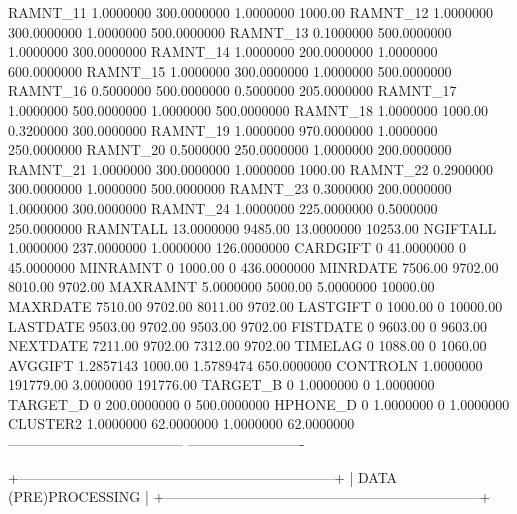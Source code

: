 \documentclass[
  11pt,
  a4paper,
  DIV=12,captions=tableheading,oneside,titlepage]{scrbook}
\let\oldverbatim\verbatim
\let\endoldverbatim\endverbatim
\renewenvironment{verbatim}{\footnotesize\oldverbatim}{\endoldverbatim}
\begin{document}
\begin{verbatim}
  RAMNT_11       1.0000000   300.0000000     1.0000000       1000.00 
  RAMNT_12       1.0000000   300.0000000     1.0000000   500.0000000 
  RAMNT_13       0.1000000   500.0000000     1.0000000   300.0000000 
  RAMNT_14       1.0000000   200.0000000     1.0000000   600.0000000 
  RAMNT_15       1.0000000   300.0000000     1.0000000   500.0000000 
  RAMNT_16       0.5000000   500.0000000     0.5000000   205.0000000 
  RAMNT_17       1.0000000   500.0000000     1.0000000   500.0000000 
  RAMNT_18       1.0000000       1000.00     0.3200000   300.0000000 
  RAMNT_19       1.0000000   970.0000000     1.0000000   250.0000000 
  RAMNT_20       0.5000000   250.0000000     1.0000000   200.0000000 
  RAMNT_21       1.0000000   300.0000000     1.0000000       1000.00 
  RAMNT_22       0.2900000   300.0000000     1.0000000   500.0000000 
  RAMNT_23       0.3000000   200.0000000     1.0000000   300.0000000 
  RAMNT_24       1.0000000   225.0000000     0.5000000   250.0000000 
  RAMNTALL      13.0000000       9485.00    13.0000000      10253.00 
  NGIFTALL       1.0000000   237.0000000     1.0000000   126.0000000 
  CARDGIFT               0    41.0000000             0    45.0000000 
  MINRAMNT               0       1000.00             0   436.0000000 
  MINRDATE         7506.00       9702.00       8010.00       9702.00 
  MAXRAMNT       5.0000000       5000.00     5.0000000      10000.00 
  MAXRDATE         7510.00       9702.00       8011.00       9702.00 
  LASTGIFT               0       1000.00             0      10000.00 
  LASTDATE         9503.00       9702.00       9503.00       9702.00 
  FISTDATE               0       9603.00             0       9603.00 
  NEXTDATE         7211.00       9702.00       7312.00       9702.00 
  TIMELAG                0       1088.00             0       1060.00 
  AVGGIFT        1.2857143       1000.00     1.5789474   650.0000000 
  CONTROLN       1.0000000     191779.00     3.0000000     191776.00 
  TARGET_B               0     1.0000000             0     1.0000000 
  TARGET_D               0   200.0000000             0   500.0000000 
  HPHONE_D               0     1.0000000             0     1.0000000 
  CLUSTER2       1.0000000    62.0000000     1.0000000    62.0000000
  --------------------------------------   -------------------------

        
+--------------------------------------------------------------------+
| DATA (PRE)PROCESSING                                               |
+--------------------------------------------------------------------+


\end{verbatim}
\end{document}
